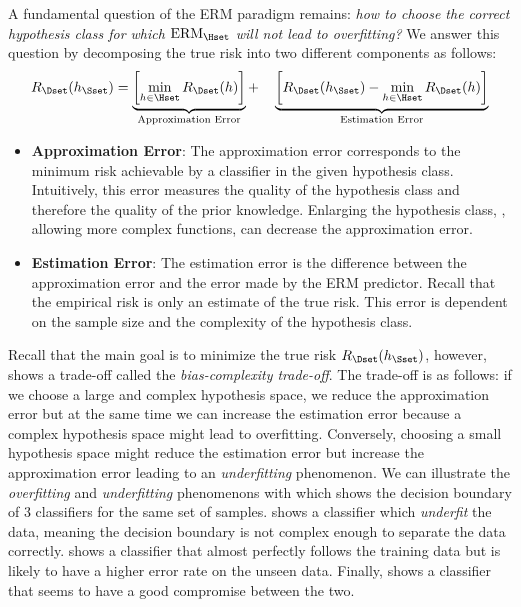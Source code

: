 A fundamental question of the ERM paradigm remains: \emph{how to choose the correct hypothesis class for which $\text{ERM}_\Hset$ will not lead to overfitting?} 
We answer this question by decomposing the true risk into two different components as follows: 
\begin{equation} \label{equation:ch2-bias_complexity_tradeoff}
  R_\Dset (h_\Sset) = 
  \underbrace{\left[ \min_{h \in \Hset} R_\Dset(h) \right]}_{\text{\scriptsize Approximation Error}} + \quad 
  \underbrace{\left[ R_\Dset(h_\Sset) - \min_{h \in \Hset} R_\Dset(h) \right]}_{\text{\scriptsize Estimation Error}} 
\end{equation}
\begin{itemize}
  \item \textbf{Approximation Error}: The approximation error corresponds to the minimum risk achievable by a classifier in the given hypothesis class.
  Intuitively, this error measures the quality of the hypothesis class and therefore the quality of the prior knowledge.
  Enlarging the hypothesis class, \ie, allowing more complex functions, can decrease the approximation error.
  \item \textbf{Estimation Error}: The estimation error is the difference between the approximation error and the error made by the ERM predictor.
  Recall that the empirical risk is only an estimate of the true risk.
  This error is dependent on the sample size and the complexity of the hypothesis class.
\end{itemize}
Recall that the main goal is to minimize the true risk $R_\Dset (h_\Sset)$, however,  shows a trade-off called the \emph{bias-complexity trade-off}.
The trade-off is as follows: if we choose a large and complex hypothesis space, we reduce the approximation error but at the same time we can increase the estimation error because a complex hypothesis space might lead to overfitting.
Conversely, choosing a small hypothesis space might reduce the estimation error but increase the approximation error leading to an \emph{underfitting} phenomenon.
We can illustrate the \emph{overfitting} and \emph{underfitting} phenomenons with  which shows the decision boundary of 3 classifiers for the same set of samples.
 shows a classifier which \emph{underfit} the data, meaning the decision boundary is not complex enough to separate the data correctly.
 shows a classifier that almost perfectly follows the training data but is likely to have a higher error rate on the unseen data.
Finally,  shows a classifier that seems to have a good compromise between the two.


